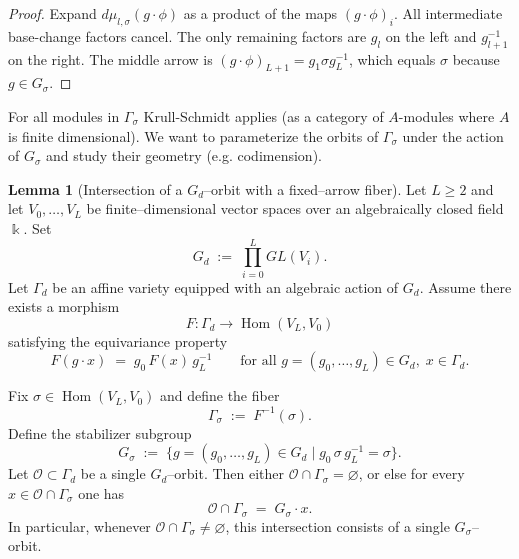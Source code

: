 \documentclass{article}
\newcommand{\Hom}{\operatorname{Hom}}
\theoremstyle{definition}
\newtheorem{lemma}[theorem]{Lemma}
\begin{document}
\begin{proof}
Expand $d\mu_{l,\sigma}(g\cdot\phi)$ as a product of the maps $(g\cdot\phi)_i$.
All intermediate base-change factors cancel. The only remaining factors are $g_l$ on the left and
$g_{l+1}^{-1}$ on the right. The middle arrow is $(g\cdot\phi)_{L+1}=g_1\sigma g_L^{-1}$, which equals
$\sigma$ because $g\in G_\sigma$. 
\end{proof}
For all modules in $\Gamma_\sigma$ Krull-Schmidt applies (as a category of $A$-modules where $A$ is finite dimensional). We want to parameterize the orbits of $\Gamma_\sigma$ under the action of $G_\sigma$ and study their geometry (e.g. codimension).
\begin{lemma}[Intersection of a $G_d$--orbit with a fixed--arrow fiber]
\label{lem:orbit_fiber_intersection}
Let $L\ge 2$ and let $V_0,\dots,V_L$ be finite--dimensional vector spaces over an algebraically closed field $\Bbbk$.  
Set
\[
G_d \;:=\; \prod_{i=0}^L GL(V_i).
\]
Let $\Gamma_d$ be an affine variety equipped with an algebraic action of $G_d$.  
Assume there exists a morphism
\[
F:\Gamma_d \longrightarrow \Hom(V_L,V_0)
\]
satisfying the equivariance property
\begin{equation}
\label{eq:equivariance}
F(g\cdot x) \;=\; g_0\,F(x)\,g_L^{-1}
\qquad
\text{for all } g=(g_0,\dots,g_L)\in G_d,\; x\in\Gamma_d .
\end{equation}

Fix $\sigma\in \Hom(V_L,V_0)$ and define the fiber
\[
\Gamma_\sigma \;:=\; F^{-1}(\sigma).
\]
Define the stabilizer subgroup
\[
G_\sigma \;:=\; \{ g=(g_0,\dots,g_L)\in G_d \mid g_0\,\sigma\,g_L^{-1}=\sigma \}.
\]
Let $\mathcal O\subset \Gamma_d$ be a single $G_d$--orbit.  
Then either $\mathcal O\cap\Gamma_\sigma=\varnothing$, or else for every
$x\in\mathcal O\cap\Gamma_\sigma$ one has
\[
\mathcal O\cap\Gamma_\sigma \;=\; G_\sigma\cdot x .
\]
In particular, whenever $\mathcal O\cap\Gamma_\sigma\neq\varnothing$, this
intersection consists of a single $G_\sigma$--orbit.
\end{lemma}
\end{document}
